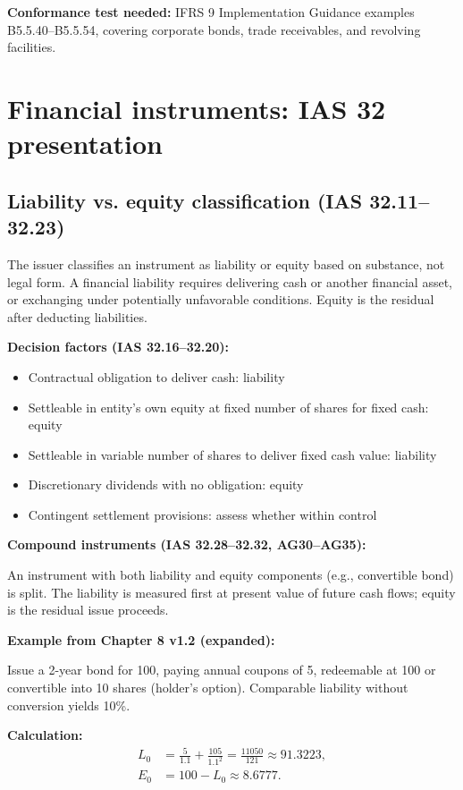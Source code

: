 \textbf{Conformance test needed:} IFRS 9 Implementation Guidance examples B5.5.40--B5.5.54,
covering corporate bonds, trade receivables, and revolving facilities.

\section{Financial instruments: IAS 32 presentation}

\subsection{Liability vs. equity classification (IAS 32.11--32.23)}

The issuer classifies an instrument as liability or equity based on substance,
not legal form. A financial liability requires delivering cash or another financial
asset, or exchanging under potentially unfavorable conditions. Equity is the
residual after deducting liabilities.

\textbf{Decision factors (IAS 32.16--32.20):}
\begin{itemize}
\item Contractual obligation to deliver cash: liability
\item Settleable in entity's own equity at fixed number of shares for fixed cash: equity
\item Settleable in variable number of shares to deliver fixed cash value: liability
\item Discretionary dividends with no obligation: equity
\item Contingent settlement provisions: assess whether within control
\end{itemize}

\textbf{Compound instruments (IAS 32.28--32.32, AG30--AG35):}

An instrument with both liability and equity components (e.g., convertible bond)
is split. The liability is measured first at present value of future cash flows;
equity is the residual issue proceeds.

\textbf{Example from Chapter 8 v1.2 (expanded):}

Issue a 2-year bond for 100, paying annual coupons of 5, redeemable at 100 or
convertible into 10 shares (holder's option). Comparable liability without
conversion yields 10\%.

\textbf{Calculation:}
\begin{align}
L_0 &= \frac{5}{1.1} + \frac{105}{1.1^2} = \frac{11050}{121} \approx 91.3223,\\
E_0 &= 100 - L_0 \approx 8.6777.
\end{align}

